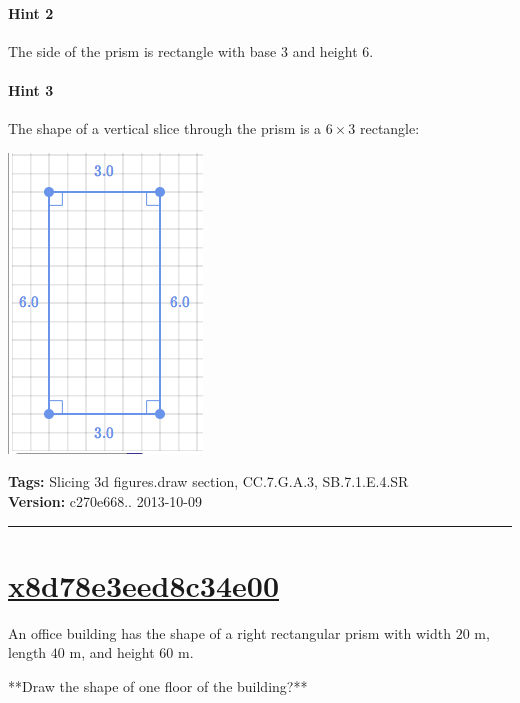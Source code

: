 \documentclass[twocolumn,10pt]{article}
\def\shrinkfactor{0.4}
\begin{document}
\paragraph{Hint 2}The side of the prism is rectangle with base $3$ and height $6$.

\paragraph{Hint 3}The shape of a vertical slice through the prism is a $6 \times 3$ rectangle:  

\includegraphics[scale=\shrinkfactor]{figures/8697a53b06e869ea09df9f318b41e82e0f50c94e.png}



\medskip
\noindent
\textbf{Tags:} {\footnotesize Slicing 3d figures.draw section, CC.7.G.A.3, SB.7.1.E.4.SR}\\
\textbf{Version:} c270e668.. 2013-10-09
\smallskip\hrule





\section{\href{https://www.khanacademy.org/devadmin/content/items/x8d78e3eed8c34e00}{x8d78e3eed8c34e00}}

\noindent
An office building has the shape of a right rectangular prism with width $20\text{ m}$, length $40\text{ m}$, and height $60\text{ m}$.

**Draw the shape of one floor of the building?**
\end{document}
